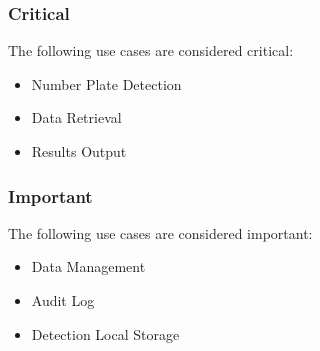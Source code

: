 \documentclass[12pt]{article}
\begin{document}
                    		\subsubsection{Critical}
                    				The following use cases are considered critical:
                    				\begin{itemize}
	                    					\item Number Plate Detection
	                    					\item Data Retrieval
	                    					\item Results Output
                    				\end{itemize}
                    				
                    		\subsubsection{Important}
                    		The following use cases are considered important:
                    				\begin{itemize}
		                    				\item Data Management
		                    				\item Audit Log
		                    				\item Detection Local Storage
                    				\end{itemize}
                    		
                    		
\end{document}
